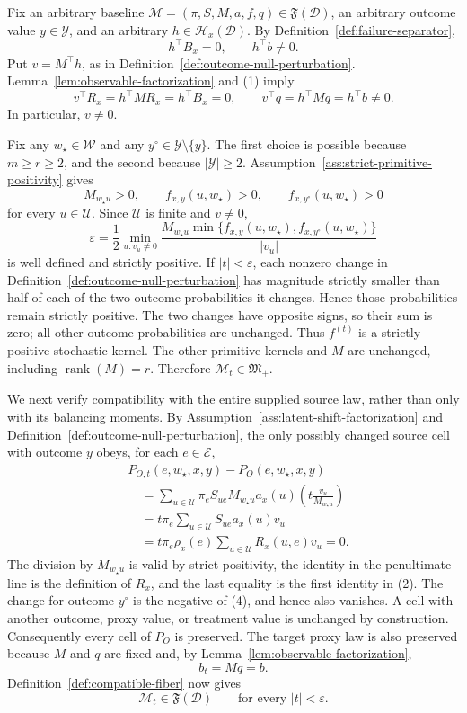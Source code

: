 Fix an arbitrary baseline \(\mathcal M=(\pi,S,M,a,f,q)\in\mathfrak F(\mathcal D)\), an arbitrary outcome value \(y\in\mathcal Y\), and an arbitrary \(h\in\mathcal H_x(\mathcal D)\). By Definition~\ref{def:failure-separator},
\[
h^{\top}B_x=0,
\qquad
h^{\top}b\ne0.
\tag{1}
\]
Put \(v=M^{\top}h\), as in Definition~\ref{def:outcome-null-perturbation}. Lemma~\ref{lem:observable-factorization} and (1) imply
\[
v^{\top}R_x=h^{\top}MR_x=h^{\top}B_x=0,
\qquad
v^{\top}q=h^{\top}Mq=h^{\top}b\ne0.
\tag{2}
\]
In particular, \(v\ne0\).

Fix any \(w_{\star}\in\mathcal W\) and any \(y^{\circ}\in\mathcal Y\setminus\{y\}\). The first choice is possible because \(m\ge r\ge2\), and the second because \(\lvert\mathcal Y\rvert\ge2\). Assumption~\ref{ass:strict-primitive-positivity} gives
\[
M_{w_{\star}u}>0,
\qquad
f_{x,y}(u,w_{\star})>0,
\qquad
f_{x,y^{\circ}}(u,w_{\star})>0
\]
for every \(u\in\mathcal U\). Since \(\mathcal U\) is finite and \(v\ne0\),
\[
\varepsilon
=\frac12\min_{u:v_u\ne0}
\frac{M_{w_{\star}u}\min\{f_{x,y}(u,w_{\star}),
f_{x,y^{\circ}}(u,w_{\star})\}}{|v_u|}
\tag{3}
\]
is well defined and strictly positive. If \(|t|<\varepsilon\), each nonzero change in Definition~\ref{def:outcome-null-perturbation} has magnitude strictly smaller than half of each of the two outcome probabilities it changes. Hence those probabilities remain strictly positive. The two changes have opposite signs, so their sum is zero; all other outcome probabilities are unchanged. Thus \(f^{(t)}\) is a strictly positive stochastic kernel. The other primitive kernels and \(M\) are unchanged, including \(\operatorname{rank}(M)=r\). Therefore \(\mathcal M_t\in\mathfrak M_{+}\).

We next verify compatibility with the entire supplied source law, rather than only with its balancing moments. By Assumption~\ref{ass:latent-shift-factorization} and Definition~\ref{def:outcome-null-perturbation}, the only possibly changed source cell with outcome \(y\) obeys, for each \(e\in\mathcal E\),
\[
\begin{aligned}
&P_{O,t}(e,w_{\star},x,y)-P_O(e,w_{\star},x,y)\\
&\quad=\sum_{u\in\mathcal U}\pi_eS_{ue}M_{w_{\star}u}a_x(u)
\left(t\frac{v_u}{M_{w_{\star}u}}\right)\\
&\quad=t\pi_e\sum_{u\in\mathcal U}S_{ue}a_x(u)v_u\\
&\quad=t\pi_e\rho_x(e)\sum_{u\in\mathcal U}R_x(u,e)v_u
=0.
\end{aligned}
\tag{4}
\]
The division by \(M_{w_{\star}u}\) is valid by strict positivity, the identity in the penultimate line is the definition of \(R_x\), and the last equality is the first identity in (2). The change for outcome \(y^{\circ}\) is the negative of (4), and hence also vanishes. A cell with another outcome, proxy value, or treatment value is unchanged by construction. Consequently every cell of \(P_O\) is preserved. The target proxy law is also preserved because \(M\) and \(q\) are fixed and, by Lemma~\ref{lem:observable-factorization},
\[
b_t=Mq=b.
\tag{5}
\]
Definition~\ref{def:compatible-fiber} now gives
\[
\mathcal M_t\in\mathfrak F(\mathcal D)
\qquad\text{for every }|t|<\varepsilon.
\tag{6}
\]


